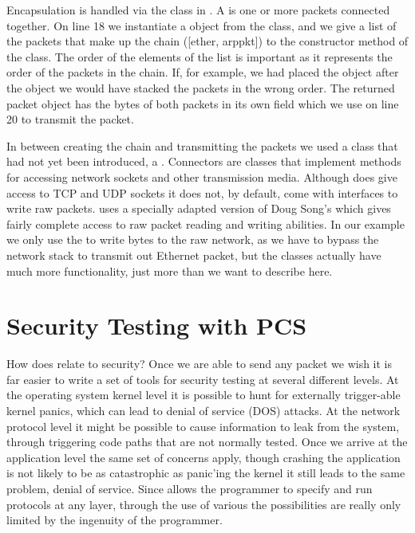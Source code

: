 \documentclass[11pt]{article}
\begin{document}
Encapsulation is handled via the  class in .
A  is one or more packets connected together.  On line 18
we instantiate a  object from the  class,
and we give a list of the packets that make up the chain ([ether,
arppkt]) to the constructor method of the class.  The order of the
elements of the list is important as it represents the order of the
packets in the chain.  If, for example, we had placed the
 object after the  object we would have
stacked the packets in the wrong order.  The returned packet object
has the bytes of both packets in its own  field which we
use on line 20 to transmit the packet.

In between creating the chain and transmitting the packets we used a
class that had not yet been introduced, a .
Connectors are classes that implement methods for accessing network
sockets and other transmission media.  Although  does
give access to TCP and UDP sockets it does not, by default, come with
interfaces to write raw packets.   uses a specially
adapted version of Doug Song's  which gives fairly
complete access to raw packet reading and writing abilities.  In our
example we only use the  to write bytes to the
raw network, as we have to bypass the network stack to transmit out
Ethernet packet, but the  classes actually have much
more functionality, just more than we want to describe here.

\section{Security Testing  with PCS}
\label{sec:security-testing-with-pcs}

How does  relate to security?  Once we are able to send
any packet we wish it is far easier to write a set of tools for
security testing at several different levels.  At the operating system
kernel level it is possible to hunt for externally trigger-able kernel
panics, which can lead to denial of service (DOS) attacks.  At the
network protocol level it might be possible to cause information to
leak from the system, through triggering code paths that are not
normally tested.  Once we arrive at the application level the same set
of concerns apply, though crashing the application is not likely to be
as catastrophic as panic'ing the kernel it still leads to the same
problem, denial of service.  Since  allows the programmer
to specify and run protocols at any layer, through the use of various
 the possibilities are really only limited by the
ingenuity of the programmer.
\end{document}
